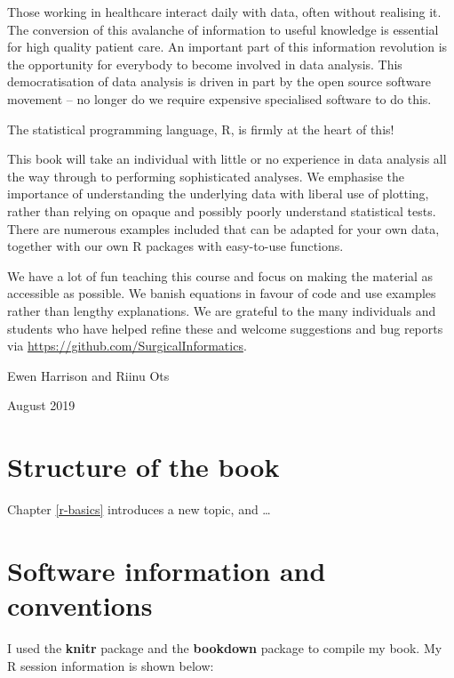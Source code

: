 \documentclass[12pt,]{krantz}
\theoremstyle{definition}
\theoremstyle{definition}
\theoremstyle{definition}
\theoremstyle{remark}
\begin{document}
Those working in healthcare interact daily with data, often without
realising it. The conversion of this avalanche of information to useful
knowledge is essential for high quality patient care. An important part
of this information revolution is the opportunity for everybody to
become involved in data analysis. This democratisation of data analysis
is driven in part by the open source software movement -- no longer do
we require expensive specialised software to do this.

The statistical programming language, R, is firmly at the heart of this!

This book will take an individual with little or no experience in data
analysis all the way through to performing sophisticated analyses. We
emphasise the importance of understanding the underlying data with
liberal use of plotting, rather than relying on opaque and possibly
poorly understand statistical tests. There are numerous examples
included that can be adapted for your own data, together with our own R
packages with easy-to-use functions.

We have a lot of fun teaching this course and focus on making the
material as accessible as possible. We banish equations in favour of
code and use examples rather than lengthy explanations. We are grateful
to the many individuals and students who have helped refine these and
welcome suggestions and bug reports via
\url{https://github.com/SurgicalInformatics}.

Ewen Harrison and Riinu Ots

August 2019

\hypertarget{structure-of-the-book}{%
\section*{Structure of the book}\label{structure-of-the-book}}


Chapter \ref{r-basics} introduces a new topic, and \ldots{}

\hypertarget{software-information-and-conventions}{%
\section*{Software information and
conventions}\label{software-information-and-conventions}}


I used the \textbf{knitr} package \citep{xie2015} and the
\textbf{bookdown} package \citep{R-bookdown} to compile
my book. My R session information is shown below:
\end{document}
